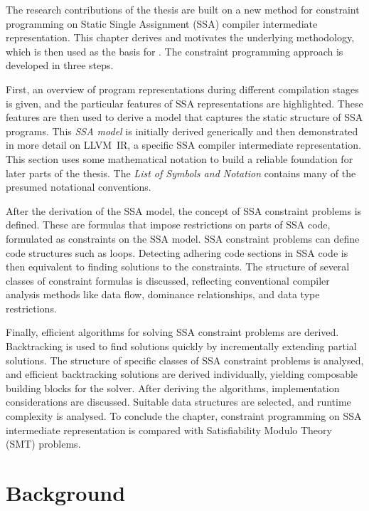 
    The research contributions of the thesis are built on a new method for
    constraint programming on Static Single Assignment (SSA) compiler
    intermediate representation.
    This chapter derives and motivates the underlying methodology, which is
    then used as the basis for
    .
    The constraint programming approach is developed in three steps.

    First, an overview of program representations during different compilation
    stages is given, and the particular features of SSA representations are
    highlighted.
    These features are then used to derive a model that captures the static
    structure of SSA programs.
    This {\it SSA model} is initially derived generically and then demonstrated
    in more detail on \mbox{LLVM IR}, a specific SSA compiler intermediate
    representation.
    This section uses some mathematical notation to build a reliable foundation
    for later parts of the thesis.
    The {\it List of Symbols and Notation} contains many of the presumed
    notational conventions.

    After the derivation of the SSA model, the concept of SSA constraint
    problems is defined.
    These are formulas that impose restrictions on parts of SSA code,
    formulated as constraints on the SSA model.
    SSA constraint problems can define code structures such as loops.
    Detecting adhering code sections in SSA code is then equivalent to finding
    solutions to the constraints.
    The structure of several classes of constraint formulas is discussed,
    reflecting conventional compiler analysis methods like data flow,
    dominance relationships, and data type restrictions.

    Finally, efficient algorithms for solving SSA constraint problems are
    derived.
    Backtracking is used to find solutions quickly by incrementally extending
    partial solutions.
    The structure of specific classes of SSA constraint problems is analysed,
    and efficient backtracking solutions are derived individually, yielding
    composable building blocks for the solver.
    After deriving the algorithms, implementation considerations are
    discussed.
    Suitable data structures are selected, and runtime complexity is analysed.
    To conclude the chapter, constraint programming on SSA intermediate
    representation is compared with Satisfiability Modulo Theory (SMT) problems.

\section{Background}

